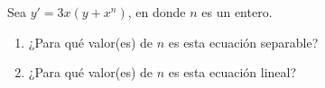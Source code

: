 \item Sea $y' = 3x(y + x^n)$, en donde $n$ es un entero.
    \begin{enumerate}
        \item[(a)] ¿Para qué valor(es) de $n$ es esta ecuación separable?
        \item[(b)] ¿Para qué valor(es) de $n$ es esta ecuación lineal?
    \end{enumerate}
